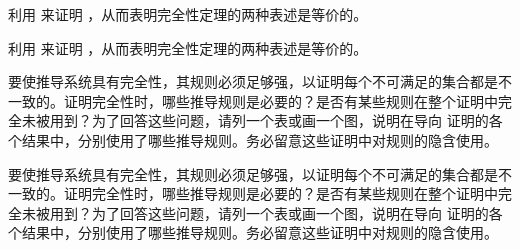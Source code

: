 \documentclass[../../../include/open-logic-section]{subfiles}
\begin{document}
\begin{prob}
利用  来证明
，从而表明完全性定理的两种表述是等价的。
\end{prob}
\tagendprob

\begin{prob}
利用  来证明
，从而表明完全性定理的两种表述是等价的。
\end{prob}
\tagendprob

\begin{prob}
要使推导系统具有完全性，其规则必须足够强，以证明每个不可满足的集合都是不一致的。证明完全性时，哪些推导规则是必要的？是否有某些规则在整个证明中完全未被用到？为了回答这些问题，请列一个表或画一个图，说明在导向  证明的各个结果中，分别使用了哪些推导规则。务必留意这些证明中对规则的隐含使用。
\end{prob}
\tagendprob

\begin{prob}
要使推导系统具有完全性，其规则必须足够强，以证明每个不可满足的集合都是不一致的。证明完全性时，哪些推导规则是必要的？是否有某些规则在整个证明中完全未被用到？为了回答这些问题，请列一个表或画一个图，说明在导向  证明的各个结果中，分别使用了哪些推导规则。务必留意这些证明中对规则的隐含使用。
\end{prob}
\tagendprob
\end{document}
